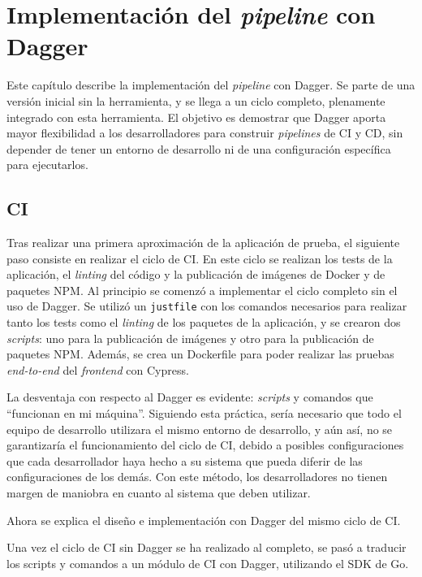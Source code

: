\chapter{Implementación del \textit{pipeline} con Dagger}
\label{chap:dagger}

Este capítulo describe la implementación del \textit{pipeline} con Dagger. Se parte de una versión inicial sin la herramienta, y se llega a un ciclo completo, plenamente integrado con esta herramienta. El objetivo es demostrar que Dagger aporta mayor flexibilidad a los desarrolladores para construir \textit{pipelines} de CI y CD, sin depender de tener un entorno de desarrollo ni de una configuración específica para ejecutarlos.

\section{CI}
\label{sec:dagger-ci}

Tras realizar una primera aproximación de la aplicación de prueba, el siguiente paso consiste en realizar el ciclo de CI. En este ciclo se realizan los tests de la aplicación, el \textit{linting} del código y la publicación de imágenes de Docker y de paquetes NPM. Al principio se comenzó a implementar el ciclo completo sin el uso de Dagger. Se utilizó un \texttt{justfile} con los comandos necesarios para realizar tanto los tests como el \textit{linting} de los paquetes de la aplicación, y se crearon dos \textit{scripts}: uno para la publicación de imágenes y otro para la publicación de paquetes NPM. Además, se crea un Dockerfile para poder realizar las pruebas \textit{end-to-end} del \textit{frontend} con Cypress\cite{cypress}.

La desventaja con respecto al Dagger es evidente: \textit{scripts} y comandos que ``funcionan en mi máquina''. Siguiendo esta práctica, sería necesario que todo el equipo de desarrollo utilizara el mismo entorno de desarrollo, y aún así, no se garantizaría el funcionamiento del ciclo de CI, debido a posibles configuraciones que cada desarrollador haya hecho a su sistema que pueda diferir de las configuraciones de los demás. Con este método, los desarrolladores no tienen margen de maniobra en cuanto al sistema que deben utilizar.

Ahora se explica el diseño e implementación con Dagger del mismo ciclo de CI.

Una vez el ciclo de CI sin Dagger se ha realizado al completo, se pasó a traducir los scripts y comandos a un módulo de CI con Dagger, utilizando el SDK de Go.

